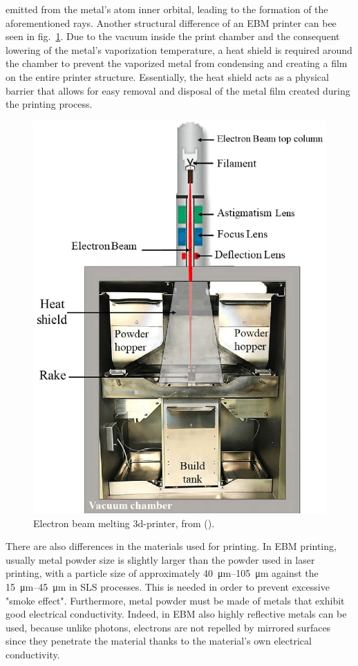 emitted from the metal's atom inner orbital, leading to the formation of the aforementioned rays. Another structural difference of an EBM printer can bee seen in fig.~\ref{fig:ebm_printer}. Due to the vacuum inside the print chamber and the consequent lowering of the metal's vaporization temperature, a heat shield is required around the chamber to prevent the vaporized metal from condensing and creating a film on the entire printer structure. Essentially, the heat shield acts as a physical barrier that allows for easy removal and disposal of the metal film created during the printing process.
\begin{figure}[H]
    \centering
    \includegraphics[scale=0.3]{Images/A-schematic-of-electron-beam-melting-EBM.png}
    \caption[EBM 3d-printer.]{Electron beam melting 3d-printer, from        \citeauthor{azam_-depth_2018} (\citeyear{azam_-depth_2018}).}
    \label{fig:ebm_printer}
\end{figure}
 There are also differences in the materials used for printing. In EBM printing, usually metal powder size is slightly larger than the powder used in laser printing, with a particle size of approximately \SIrange[range-phrase = --]{40}{105}{\micro\meter} against the \SIrange[range-phrase = --]{15}{45}{\micro\meter} in SLS processes. This is needed in order to prevent excessive "smoke effect". Furthermore, metal powder must be made of metals that exhibit good electrical conductivity. Indeed, in EBM also highly reflective metals can be used, because unlike photons, electrons are not repelled by mirrored surfaces since they penetrate the material thanks to the material's own electrical conductivity.
